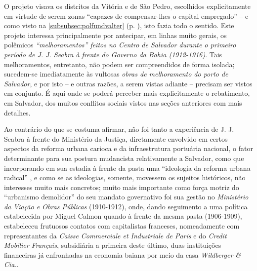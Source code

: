 O projeto visava os distritos da Vitória e de São Pedro, escolhidos explicitamente em virtude de serem zonas ``capazes de compensar-lhes o capital empregado'' \cite[p.~95]{CUNHA2011} -- e como visto na \autoref{subsubsec:polfundvalter} (p. \pageref{subsubsec:polfundvalter}), isto fazia todo o sentido. Este projeto interessa principalmente por antecipar, em linhas muito gerais, os polêmicos \textit{``melhoramentos'' feitos no Centro de Salvador durante o primeiro período de J. J. Seabra à frente do Governo da Bahia (1912-1916)}. Tais melhoramentos, entretanto, não podem ser compreendidos de forma isolada; sucedem-se imediatamente às vultosas \textit{obras de melhoramento do porto de Salvador}, e por isto -- e outras razões, a serem vistas adiante -- precisam ser vistos em conjunto. É aqui onde se poderá perceber mais explicitamente o rebatimento, em Salvador, dos muitos conflitos sociais vistos nas seções anteriores com mais detalhes.

Ao contrário do que se costuma afirmar, não foi tanto a experiência de J. J. Seabra à frente do Ministério da Justiça, diretamente envolvido em certos aspectos da reforma urbana carioca e da infraestrutura portuária nacional, o fator determinante para sua postura mudancista relativamente a Salvador, como que incorporando em sua estadia à frente da pasta uma ``ideologia da reforma urbana radical'' \cite{sampaio_formas_1999}, e como se as ideologias, somente, movessem os sujeitos históricos, não interesses muito mais concretos; muito mais importante como força motriz do ``urbanismo demolidor'' do seu mandato governativo foi sua gestão no \textit{Ministério da Viação e Obras Públicas} (1910-1912), onde, dando seguimento a uma política estabelecida por Miguel Calmon quando à frente da mesma pasta (1906-1909), estabeleceu frutuosos contatos com capitalistas franceses, nomeadamente com representantes da \textit{Caisse Commerciale et Industriale de Paris} e do \textit{Credit Mobilier Français}, subsidiária a primeira deste último, duas instituições financeiras já enfronhadas na economia baiana por meio da casa \textit{Wildberger \& Cia.}. 

